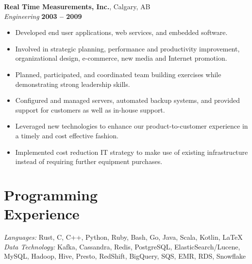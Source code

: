 \documentclass[margin,line]{resume}
\begin{document}
\begin{resume}
    \pagebreak[4]

    \textbf{Real Time Measurements, Inc.}, Calgary, AB \vspace{2mm}\\\vspace{1mm}%
    \textsl{Engineering} \hfill \textbf{2003 -- 2009}\\

    \begin{itemize}
        \item Developed end user applications, web services, and embedded
        software.
        \item Involved in strategic planning, performance and productivity
        improvement, organizational design, e-commerce, new media and Internet
        promotion.
        \item Planned, participated, and coordinated team building exercises
        while demonstrating strong leadership skills.
        \item Configured and managed servers, automated backup systems, and
        provided support for customers as well as in-house support.
        \item Leveraged new technologies to enhance our product-to-customer
        experience in a timely and cost effective fashion.
        \item Implemented cost reduction IT strategy to make use of existing
        infrastructure instead of requiring further equipment purchases.
    \end{itemize}

    \vspace{3mm}
    
    \section{\mysidestyle Programming\\Experience}

    \emph{Languages:} Rust, C, C++, Python, Ruby, Bash, Go, Java, Scala, Kotlin, \LaTeX \\
    \emph{Data Technology:} Kafka, Cassandra, Redis, PostgreSQL, ElasticSearch/Lucene,
     MySQL, Hadoop, Hive, Presto, RedShift, BigQuery, SQS, EMR, RDS, Snowflake

\end{resume}
\end{document}

